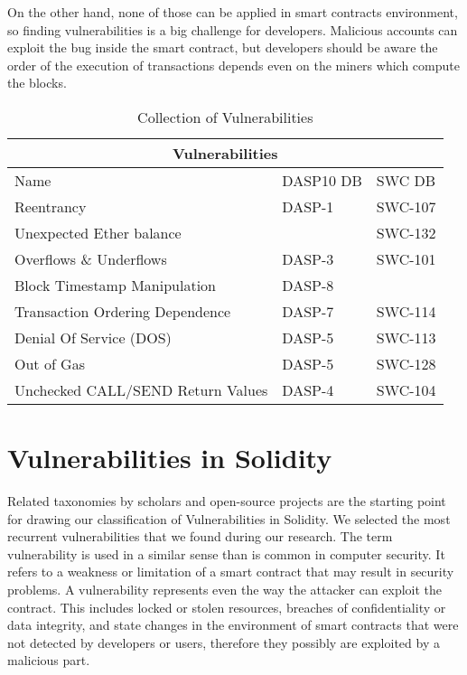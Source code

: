 \documentclass[a4paper,sigconf, language=french,
language=german, language=spanish, language=english]{acmart}
\begin{document}
On the other hand, none of those can be applied in smart contracts environment, so finding vulnerabilities is a big challenge for developers. 
Malicious accounts can exploit the bug inside the smart contract, but developers should be aware the order of the execution of transactions depends even on the miners which compute the blocks.

\begin{table*}
  \caption{Collection of Vulnerabilities}
  \label{tab:CollectionOfVulnerabilities}
  \begin{tabular}{ |p{5cm}|p{5cm}|p{5cm}| }
  \hline
  \multicolumn{3}{|c|}{Vulnerabilities} \\
  \hline
  Name  & DASP10 DB & SWC DB \\
  \hline
  Reentrancy  & DASP-1 & SWC-107 \\
  \hline
  Unexpected Ether balance  & & SWC-132  \\
  \hline
  Overflows \& Underflows  & DASP-3 & SWC-101 \\
  \hline
  Block Timestamp Manipulation  & DASP-8 & \\
  \hline
  Transaction Ordering Dependence  & DASP-7  & SWC-114 \\
  \hline
  Denial Of Service (DOS)  & DASP-5 &  SWC-113\\
  \hline
  Out of Gas  & DASP-5 & SWC-128 \\
  \hline
  Unchecked CALL/SEND Return Values  & DASP-4 & SWC-104\\
  \hline
  \end{tabular}
\end{table*}

\section{Vulnerabilities in Solidity}
\label{Vulnerabilities}
Related taxonomies by scholars and open-source projects are the starting point for drawing our classification of Vulnerabilities in Solidity. 
We selected the most recurrent vulnerabilities that we found during our research.
The term vulnerability is used in a similar sense than is common in computer security. 
It refers to a weakness or limitation of a smart contract that may result in
security problems. 
A vulnerability represents even the way the attacker can exploit the contract. 
This includes locked or stolen resources, breaches of confidentiality or data integrity, and state
changes in the environment of smart contracts that were not
detected by developers or users, therefore they possibly are exploited by a malicious part.
\end{document}
